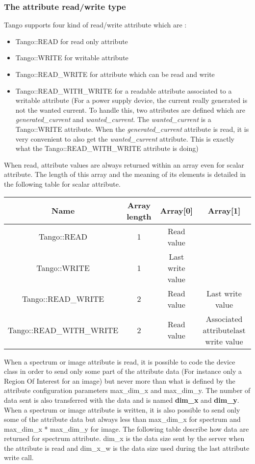 \subsubsection{The attribute read/write type}

Tango supports four kind of read/write attribute which are :
\begin{itemize}
\item Tango::READ for read only attribute
\item Tango::WRITE for writable attribute
\item Tango::READ\_WRITE for attribute which can be read
and write
\item Tango::READ\_WITH\_WRITE for a readable attribute
associated to a writable attribute (For a power supply device, the
current really generated is not the wanted current. To handle this,
two attributes are defined which are \emph{generated\_current} and
\emph{wanted\_current}. The \emph{wanted\_current} is a Tango::WRITE
attribute. When the \emph{generated\_current} attribute is read, it
is very convenient to also get the \emph{wanted\_current} attribute.
This is exactly what the Tango::READ\_WITH\_WRITE attribute is doing)
\end{itemize}
When read, attribute values are always returned within an array even
for scalar attribute. The length of this array and the meaning of
its elements is detailed in the following table for scalar attribute.

\vspace{0.3cm}


\begin{center}
\begin{longtable}{|c|c|c|c|}
\hline 
Name & Array length & Array{[}0{]} & Array{[}1{]}\tabularnewline
\hline 
\hline 
Tango::READ & 1 & Read value & \tabularnewline
\hline 
Tango::WRITE & 1 & Last write value & \tabularnewline
\hline 
Tango::READ\_WRITE & 2 & Read value & Last write value\tabularnewline
\hline 
Tango::READ\_WITH\_WRITE  & 2 & Read value & Associated attributelast write value\tabularnewline
\hline 
\end{longtable}
\par\end{center}

\vspace{0.3cm}


When a spectrum or image attribute is read, it is possible to code
the device class in order to send only some part of the attribute
data (For instance only a Region Of Interest for an image) but never
more than what is defined by the attribute configuration parameters
max\_dim\_x and max\_dim\_y. The number of data sent is also transferred
with the data and is named \textbf{dim\_x} and \textbf{dim\_y}.
When a spectrum or image attribute is written, it is also possible
to send only some of the attribute data but always less than max\_dim\_x
for spectrum and max\_dim\_x {*} max\_dim\_y for image. The following
table describe how data are returned for spectrum attribute. dim\_x
is the data size sent by the server when the attribute is read and
dim\_x\_w is the data size used during the last attribute write call.

